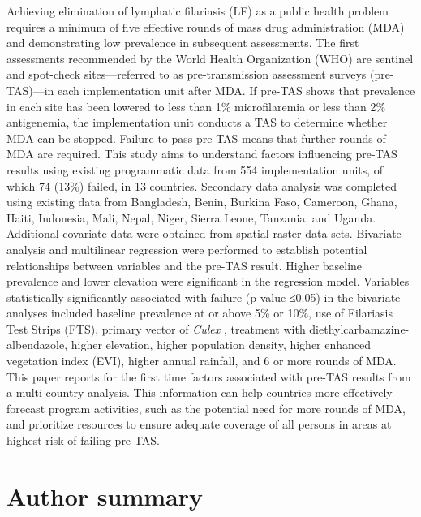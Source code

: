 \documentclass[11pt,a4paper]{article}
\begin{document}
Achieving elimination of lymphatic filariasis (LF) as a public health problem requires a minimum of five effective rounds of mass drug administration (MDA) and demonstrating low prevalence in subsequent assessments. The first assessments recommended by the World Health Organization (WHO) are sentinel and spot-check sites—referred to as pre-transmission assessment surveys (pre-TAS)—in each implementation unit after MDA. If pre-TAS shows that prevalence in each site has been lowered to less than 1\% microfilaremia or less than 2\% antigenemia, the implementation unit conducts a TAS to determine whether MDA can be stopped. Failure to pass pre-TAS means that further rounds of MDA are required. This study aims to understand factors influencing pre-TAS results using existing programmatic data from 554 implementation units, of which 74 (13\%) failed, in 13 countries. Secondary data analysis was completed using existing data from Bangladesh, Benin, Burkina Faso, Cameroon, Ghana, Haiti, Indonesia, Mali, Nepal, Niger, Sierra Leone, Tanzania, and Uganda. Additional covariate data were obtained from spatial raster data sets. Bivariate analysis and multilinear regression were performed to establish potential relationships between variables and the pre-TAS result. Higher baseline prevalence and lower elevation were significant in the regression model. Variables statistically significantly associated with failure (p-value ≤0.05) in the bivariate analyses included baseline prevalence at or above 5\% or 10\%, use of Filariasis Test Strips (FTS), primary vector of \textit{Culex} , treatment with diethylcarbamazine-albendazole, higher elevation, higher population density, higher enhanced vegetation index (EVI), higher annual rainfall, and 6 or more rounds of MDA. This paper reports for the first time factors associated with pre-TAS results from a multi-country analysis. This information can help countries more effectively forecast program activities, such as the potential need for more rounds of MDA, and prioritize resources to ensure adequate coverage of all persons in areas at highest risk of failing pre-TAS.

\section{Author summary}
\end{document}

